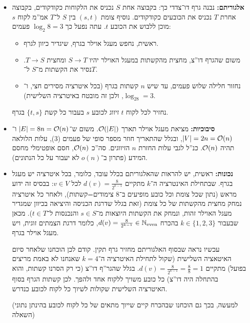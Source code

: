 \documentclass[]{../../../../tex/classes/homework}
\begin{document}
	\section{}
	\begin{itemize}
		\item \textbf{אלגוריתם: }נבנה גרף דו־צדדי כך: בקבוצה אחת $S$ נכניס את הלקוחות כקודקודים, בקבוצה אחרת $T$ נכניס את הכובעים כקודקודים. נוסיף צומת $(s, t)$ בין $S$ ל־$T$ אמ''מ לקוח $s$ מוכן ללבוש את הכובע $t$. עתה נפעל כך $\log_2 8 = 3$ פעמים: 
		\begin{itemize}
			\item ראשית, נחפש מעגל אוילר בגרף, שיגדיר כיוון לגרף. 
			\item משום שהגרף דו''צ, מחצית מהקשתות במעגל האוילר יהיו $S \to T$ ומחצית $T \to S$. נסיר את הקשתות מ־$S$ ל־$T$. 
			\item נחזור חלילה שלוש פעמים, עד שיש $n$ קשתות בגרף (בכל איטרציה מסירים חצי, ו־$\log_28 = 3$, ולכן זה מובטח באיטרציה השלישית). 
		\end{itemize}
		נחזיר לכל לקוח $t$ זיווג לכובע $s$ בעבור כל קשת $\{t, s\}$ בגרף. 	
		\item \textbf{סיבוכיות: }מציאת מעגל אוילר תארך $\mathcal{O}(\left \lvert E \right \rvert)$. משום ש־$\left \lvert E \right \rvert = 8n = \mathcal{O}(n)$ ו־$\left \lvert V \right \rvert = 2n = \mathcal{O}(n)$, ובגלל שהתאריך חוזר מספר סופי של פעמים ($3$), עלות הלולאה תהיה $\mathcal{O}(n)$. כנ''ל לגבי עלות החזרת $n$ הזיווגים. סה''כ $\mathcal{O}(n)$, חסם אופטימלי מחסם המידע (פתרון ב־$o(n)$ לא יעבור על כל הנתונים). 
		\item \textbf{נכונות: }ראשית, יש להראות שהאלגוריתם בכלל עובד, כלומר, בכל איטרציה יש מעגל בגרף. שבתחילת האינטרציה ה־$k$ מתקיים $d(v) = \frac{8}{2^{k - 1}}$ לכל $v \in V$: בבסיס זה ידוע מראש (נתון שכל צומת וכל כובע מופיעים ב־$8$ צימודים=קשתות), ולאחר כל איטרציה נמחק מחצית מהקשתות של כל צומת (זאת בגלל שדרגת הכניסה והיציאה בכיוון שמגדיר מעגל האוילר זהות, ונמחק את הקשתות היוצאות מ־$s \in S$ והנכנסות ל־$t \in T$). מכאן שבעבור $k \in \{1, 2, 3\}$ בהכרח $d(v)=\frac{8}{2^{k - 1}} \in \mathbb{N}_{\mathrm{even}}$, כלומר דרגת הצמתים זוגית, ויש מעגל אוילר בגרף. 
		
		עכשיו נראה שבסוף האלגוריתם מחזיר גרף תקין. קודם לכן הוכחנו שלאחר סיום האיטאציה השלישית (שקול לתחילת האיטרציה ה־$k = 4$ שאנחנו לא באמת מריצים בפועל) מתקיים $d(v) = \frac{8}{2^{k - 1}} = \frac{8}{8} = 1$. בגלל שהגר''ף דו''צ (כי רק הסרנו קשתות, והוא בהתחלה היה דו''צ) כל כובע משויך ללקוח אחד ולהפך. לכן קשתות הגרף בסוף האיטרציה השלישית שקולות לשיוך כל לקוח לכובע כנדרש. 
		
		(למעשה, בכך גם הוכחנו שבהכרח קיים שייוך מתאים של כל לקוח לכובע בהינתן נתוני השאלה)
	\end{itemize}
	
\end{document}
